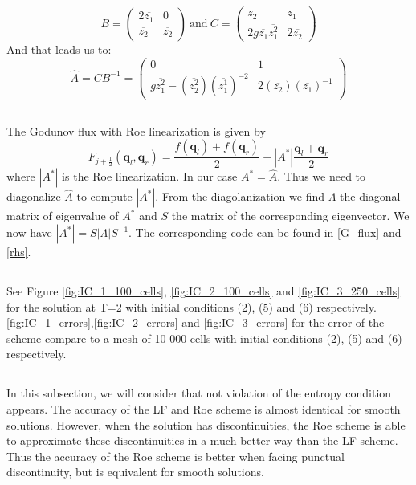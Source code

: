 \documentclass[11pt,a4paper]{article}
\begin{document}
\begin{equation}
    B = \begin{pmatrix} 2\overline{z_1} & 0 \\ \overline{z_2} & \overline{z_2}\end{pmatrix} \ \text{and} \ C = \begin{pmatrix} \overline{z_2} & \overline{z_1} \\ 2g\overline{z_1}\overline{z_1^2} & 2\overline{z_2}\end{pmatrix}
\end{equation}
And that leads us to: 
\begin{equation}
    \hat{A}=CB^{-1} = \begin{pmatrix} 0 & 1 \\ g\overline{z_1^2}-(\overline{z_2^2})(\overline{z_1^1})^{-2} & 2(\overline{z_2})(\overline{z_1})^{-1}\end{pmatrix} 
\end{equation}

\subsection{}

The Godunov flux with Roe linearization is given by 
\[F_{j+\frac{1}{2}}(\mathbf{q}_l,\mathbf{q}_r)=\frac{f(\mathbf{q}_l)+f(\mathbf{q}_r)}{2} - |A^*|\frac{\mathbf{q}_l+\mathbf{q}_r}{2}\] where $|A^*|$ is the Roe linearization. In our case $A^*=\hat{A}$. Thus we need to diagonalize $\hat{A}$ to compute $|A^*|$. From the diagolanization we find $\Lambda$ the diagonal matrix of eigenvalue of $A^*$ and $S$ the matrix of the corresponding eigenvector. We now have $|A^*|=S|\Lambda|S^{-1}$. The corresponding code can be found in \ref{G_flux} and \ref{rhs}.

\subsection{}

See Figure \ref{fig:IC_1_100_cells}, \ref{fig:IC_2_100_cells} and \ref{fig:IC_3_250_cells} for the solution at T=2 with initial conditions (2), (5) and (6) respectively. 
\ref{fig:IC_1_errors},\ref{fig:IC_2_errors} and \ref{fig:IC_3_errors} for the error of the scheme compare to a mesh of 10 000 cells with initial conditions (2), (5) and (6) respectively.

\subsection{}
In this subsection, we will consider that not violation of the entropy condition appears. The accuracy of the LF and Roe scheme is almost identical for smooth solutions. However, when the solution has discontinuities, the Roe scheme is able to approximate these discontinuities in a much better way than the LF scheme. Thus the accuracy of the Roe scheme is better when facing punctual discontinuity, but is equivalent for smooth solutions. 
\end{document}
